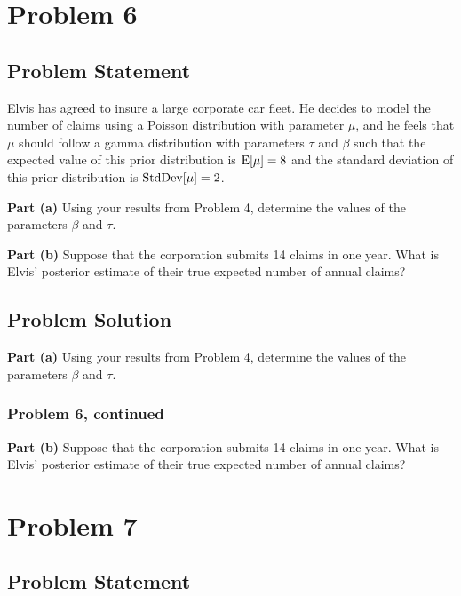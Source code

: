 \documentclass[12pt]{article}
\theoremstyle{definition}
\begin{document}
\newpage
\section*{Problem 6}

\subsection*{Problem Statement}

Elvis has agreed to insure a large corporate car fleet. He decides to model the number of claims using a Poisson distribution with parameter $\mu$, and he feels that $\mu$ should follow a gamma distribution with parameters $\tau$ and $\beta$ such that the expected value of this prior distribution is $\hbox{E}[\mu] = 8$ and the standard deviation of this prior distribution is $\hbox{StdDev}[\mu] = 2$.

\bigskip
\noindent
{\bf Part (a)} Using your results from Problem 4, determine the values of the parameters $\beta$ and $\tau$.

\bigskip
\noindent
{\bf Part (b)} Suppose that the corporation submits 14 claims in one year. What is Elvis' posterior estimate of their true expected number of annual claims?


\subsection*{Problem Solution}

\noindent
{\bf Part (a)} Using your results from Problem 4, determine the values of the parameters $\beta$ and $\tau$.

\newpage
\subsubsection*{Problem 6, continued}

\vspace{2.5in}
\noindent
{\bf Part (b)} Suppose that the corporation submits 14 claims in one year. What is Elvis' posterior estimate of their true expected number of annual claims?


\newpage
\section*{Problem 7}

\subsection*{Problem Statement}
\end{document}
